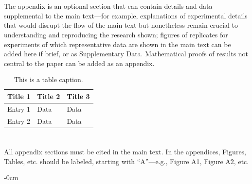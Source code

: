 \documentclass[preprints,article,accept,pdftex,moreauthors]{Definitions/mdpi}
\begin{document}
\section[\appendixname~\thesection]{}
\subsection[\appendixname~\thesubsection]{}
The appendix is an optional section that can contain details and data supplemental to the main text---for example, explanations of experimental details that would disrupt the flow of the main text but nonetheless remain crucial to understanding and reproducing the research shown; figures of replicates for experiments of which representative data are shown in the main text can be added here if brief, or as Supplementary Data. Mathematical proofs of results not central to the paper can be added as an appendix.

\begin{table}[H] 
\caption{This is a table caption.\label{tab5}}
\begin{tabularx}{\textwidth}{CCC}
\toprule
\textbf{Title 1}	& \textbf{Title 2}	& \textbf{Title 3}\\
\midrule
Entry 1		& Data			& Data\\
Entry 2		& Data			& Data\\
\bottomrule
\end{tabularx}
\end{table}

\section[\appendixname~\thesection]{}
All appendix sections must be cited in the main text. In the appendices, Figures, Tables, etc. should be labeled, starting with ``A''---e.g., Figure A1, Figure A2, etc.

\begin{adjustwidth}{-\extralength}{0cm}





\PublishersNote{}
\end{adjustwidth}
\end{document}

